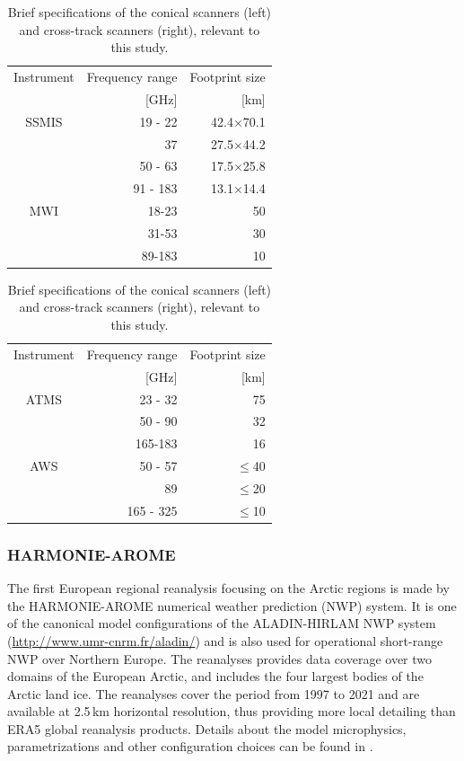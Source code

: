 \documentclass[12pt,oneside,a4paper]{article}
\begin{document}
\begin{table}[!t]
	\footnotesize
	\centering
	\caption{Brief specifications of the conical scanners (left) and cross-track scanners (right), relevant to this study.}
	\label{tab:specifications_instruments}	
	\parbox{.45\linewidth}{
	\centering
	\begin{tabular}{crr}
	\toprule
		Instrument & Frequency range 	& Footprint size \\
					& [GHz]             & [km]       \\
		\midrule			
		SSMIS	   &19 - 22		& 42.4$\times$70.1	\\
				   &37          &27.5$\times$44.2  \\
				   &50 - 63       & 17.5$\times$25.8 \\
				   &91 - 183    &  13.1$\times$14.4\\
		\midrule
		MWI 	   &18-23 		&50\\
				   &31-53 		& 30\\
				   & 89-183 	& 10\\	
		\bottomrule		
	\end{tabular}
	}
\hfill
\parbox{.45\linewidth}{
	\centering
	\begin{tabular}{crr}
	\toprule
	Instrument & Frequency range 	& Footprint size \\
	& [GHz]             & [km]       \\
	\midrule			
	ATMS	    &23 - 32		& 75	\\
				&50 - 90        &32  \\
				&165-183        & 16 \\
	\midrule
	AWS 	   &50 - 57 		& $\le$40\\
			   &89 				& $\le$20\\
			   & 165 - 325 		& $\le$10\\	
	\bottomrule		
\end{tabular}
}
\end{table}



\subsubsection{HARMONIE-AROME}
%
\label{sec:harmonie}
The first European regional reanalysis focusing on the Arctic regions is made
by the HARMONIE-AROME numerical weather prediction (NWP) system. It is one of
the canonical model configurations of the ALADIN-HIRLAM NWP system
(\url{http://www.umr-cnrm.fr/aladin/}) and is also used for operational
short-range NWP over Northern Europe. The reanalyses provides data coverage
over two domains of the European Arctic, and includes the four largest bodies
of the Arctic land ice. The reanalyses cover the period from 1997 to 2021 and
are available at 2.5\,km horizontal resolution, thus providing more local
detailing than ERA5 global reanalysis products. Details about the model
microphysics, parametrizations and other configuration choices can be found in
\citet{bengtsson:2017:harmo}.
 
\end{document}

